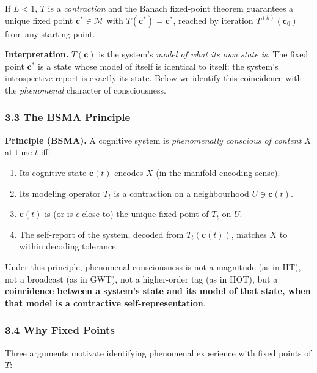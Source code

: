 \documentclass[
  11pt,
  a4paper,
]{article}
\providecommand{\tightlist}{%
  \setlength{\itemsep}{0pt}\setlength{\parskip}{0pt}}
\begin{document}
If \(L < 1\), \(T\) is a \emph{contraction} and the Banach fixed-point
theorem guarantees a unique fixed point \(\mathbf{c}^* \in \mathcal{M}\)
with \(T(\mathbf{c}^*) = \mathbf{c}^*\), reached by iteration
\(T^{(k)}(\mathbf{c}_0)\) from any starting point.

\textbf{Interpretation.} \(T(\mathbf{c})\) is the system's \emph{model
of what its own state is}. The fixed point \(\mathbf{c}^*\) is a state
whose model of itself is identical to itself: the system's introspective
report is exactly its state. Below we identify this coincidence with the
\emph{phenomenal} character of consciousness.

\subsubsection{3.3 The BSMA Principle}\label{the-bsma-principle}

\textbf{Principle (BSMA).} A cognitive system is \emph{phenomenally
conscious of content} \(X\) at time \(t\) iff:

\begin{enumerate}
\def\labelenumi{\arabic{enumi}.}
\tightlist
\item
  Its cognitive state \(\mathbf{c}(t)\) encodes \(X\) (in the
  manifold-encoding sense).
\item
  Its modeling operator \(T_t\) is a contraction on a neighbourhood
  \(U \ni \mathbf{c}(t)\).
\item
  \(\mathbf{c}(t)\) is (or is \(\epsilon\)-close to) the unique fixed
  point of \(T_t\) on \(U\).
\item
  The self-report of the system, decoded from \(T_t(\mathbf{c}(t))\),
  matches \(X\) to within decoding tolerance.
\end{enumerate}

Under this principle, phenomenal consciousness is not a magnitude (as in
IIT), not a broadcast (as in GWT), not a higher-order tag (as in HOT),
but a \textbf{coincidence between a system's state and its model of that
state, when that model is a contractive self-representation}.

\subsubsection{3.4 Why Fixed Points}\label{why-fixed-points}

Three arguments motivate identifying phenomenal experience with fixed
points of \(T\):
\end{document}
